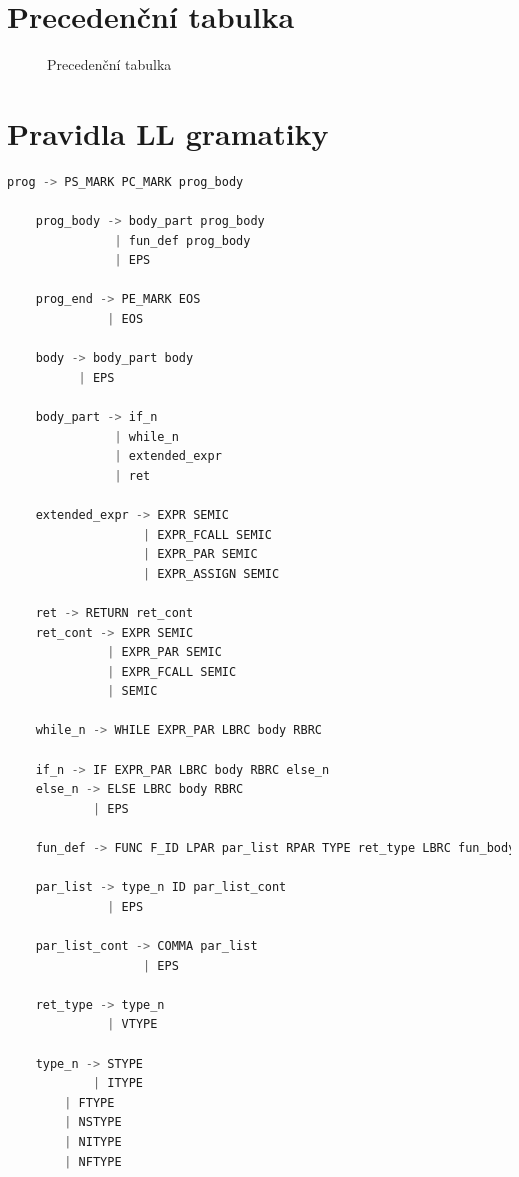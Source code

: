 \documentclass[a4paper, 11pt]{article}
\begin{document}
	\begingroup\centering
	\section*{Precedenční tabulka}
	\endgroup
	\vspace{1.8cm}
	\begin{figure}[h]
		\centering
		\hspace*{-2cm}
		\label{prec_table}
		\caption{Precedenční tabulka}
	\end{figure}
	\newpage
	
	\begingroup\centering
	\section*{Pravidla LL gramatiky}
	\label{gram}
	\endgroup
	\begin{lstlisting}[language=Python]
	prog -> PS_MARK PC_MARK prog_body

	prog_body -> body_part prog_body
	           | fun_def prog_body
	           | EPS
	
	prog_end -> PE_MARK EOS
	          | EOS
	
	body -> body_part body
	      | EPS
	
	body_part -> if_n
	           | while_n
	           | extended_expr
	           | ret
	
	extended_expr -> EXPR SEMIC 
	               | EXPR_FCALL SEMIC
	               | EXPR_PAR SEMIC
	               | EXPR_ASSIGN SEMIC
	
	ret -> RETURN ret_cont
	ret_cont -> EXPR SEMIC
	          | EXPR_PAR SEMIC
	          | EXPR_FCALL SEMIC
	          | SEMIC
	
	while_n -> WHILE EXPR_PAR LBRC body RBRC
	
	if_n -> IF EXPR_PAR LBRC body RBRC else_n
	else_n -> ELSE LBRC body RBRC
	        | EPS
		  
	fun_def -> FUNC F_ID LPAR par_list RPAR TYPE ret_type LBRC fun_body RBRC
	
	par_list -> type_n ID par_list_cont
	          | EPS
	
	par_list_cont -> COMMA par_list
	               | EPS
				
	ret_type -> type_n
	          | VTYPE
	
	type_n -> STYPE
	        | ITYPE
		| FTYPE
		| NSTYPE
		| NITYPE
		| NFTYPE

	\end{lstlisting}

\end{document}
